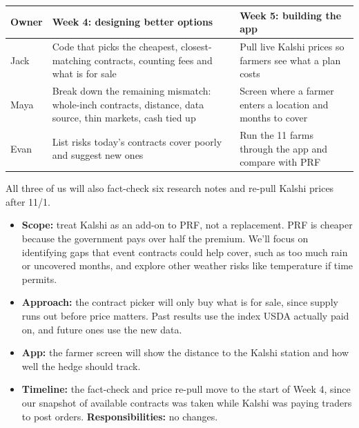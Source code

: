 \documentclass[10pt]{article}
\newcommand{\head}[1]{\par\vspace{4pt}{\large\bfseries #1}\par\vspace{1pt}}
\begin{document}
\head{2. Remaining work for Milestone II (due 11/12)}

{\small
\begin{tabularx}{\textwidth}{@{}lYY@{}}
\toprule
Owner & Week 4: designing better options & Week 5: building the app \\
\midrule
Jack & Code that picks the cheapest, closest-matching contracts, counting fees
  and what is for sale & Pull live Kalshi prices so farmers see what a plan
  costs \\
Maya & Break down the remaining mismatch: whole-inch contracts, distance, data
  source, thin markets, cash tied up & Screen where a farmer enters a location
  and months to cover \\
Evan & List risks today's contracts cover poorly and suggest new ones & Run
  the 11 farms through the app and compare with PRF \\
\bottomrule
\end{tabularx}
}
\par\vspace{1pt}
All three of us will also fact-check six research notes and re-pull Kalshi
prices after 11/1.

\head{3. Refinements to our plan}
\begin{itemize}
  \item \textbf{Scope:} treat Kalshi as an add-on to PRF, not a replacement. PRF is cheaper because the government pays over half the premium. We’ll focus on identifying gaps that event contracts could help cover, such as too much rain or uncovered months, and explore other weather risks like temperature if time permits.
  \item \textbf{Approach:} the contract picker will only buy what is for sale,
    since supply runs out before price matters. Past results use the index
    USDA actually paid on, and future ones use the new data.
  \item \textbf{App:} the farmer screen will show the distance to the Kalshi
    station and how well the hedge should track.
  \item \textbf{Timeline:} the fact-check and price re-pull move to the start
    of Week 4, since our snapshot of available contracts was taken while
    Kalshi was paying traders to post orders. \textbf{Responsibilities:} no
    changes.
\end{itemize}
\end{document}
